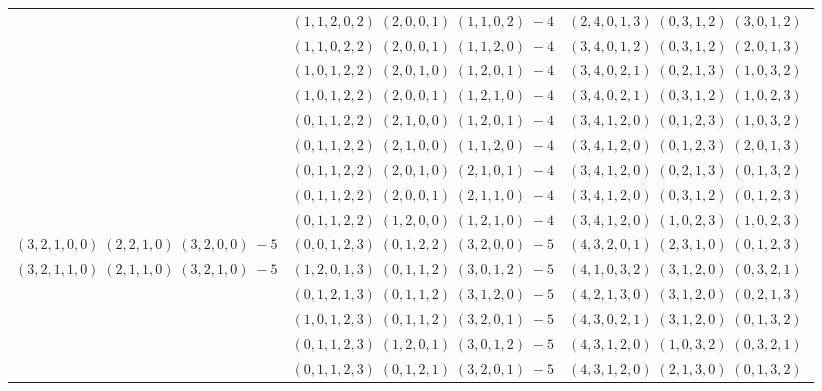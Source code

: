 \documentclass[11pt]{article}
\begin{document}
\begin{longtable}[l]{|c|c|c|}
 \cline{2-3} 
 & $(1 ,1 ,2 ,0 ,2) \;(2 ,0 ,0 ,1) \;(1 ,1 ,0 ,2) \;-4$ & $(2 ,4 ,0 ,1 ,3) \;(0 ,3 ,1 ,2) \;(3 ,0 ,1 ,2) \;$\\ 
 \cline{2-3} 
 & $(1 ,1 ,0 ,2 ,2) \;(2 ,0 ,0 ,1) \;(1 ,1 ,2 ,0) \;-4$ & $(3 ,4 ,0 ,1 ,2) \;(0 ,3 ,1 ,2) \;(2 ,0 ,1 ,3) \;$\\ 
 \cline{2-3} 
 & $(1 ,0 ,1 ,2 ,2) \;(2 ,0 ,1 ,0) \;(1 ,2 ,0 ,1) \;-4$ & $(3 ,4 ,0 ,2 ,1) \;(0 ,2 ,1 ,3) \;(1 ,0 ,3 ,2) \;$\\ 
 \cline{2-3} 
 & $(1 ,0 ,1 ,2 ,2) \;(2 ,0 ,0 ,1) \;(1 ,2 ,1 ,0) \;-4$ & $(3 ,4 ,0 ,2 ,1) \;(0 ,3 ,1 ,2) \;(1 ,0 ,2 ,3) \;$\\ 
 \cline{2-3} 
 & $(0 ,1 ,1 ,2 ,2) \;(2 ,1 ,0 ,0) \;(1 ,2 ,0 ,1) \;-4$ & $(3 ,4 ,1 ,2 ,0) \;(0 ,1 ,2 ,3) \;(1 ,0 ,3 ,2) \;$\\ 
 \cline{2-3} 
 & $(0 ,1 ,1 ,2 ,2) \;(2 ,1 ,0 ,0) \;(1 ,1 ,2 ,0) \;-4$ & $(3 ,4 ,1 ,2 ,0) \;(0 ,1 ,2 ,3) \;(2 ,0 ,1 ,3) \;$\\ 
 \cline{2-3} 
 & $(0 ,1 ,1 ,2 ,2) \;(2 ,0 ,1 ,0) \;(2 ,1 ,0 ,1) \;-4$ & $(3 ,4 ,1 ,2 ,0) \;(0 ,2 ,1 ,3) \;(0 ,1 ,3 ,2) \;$\\ 
 \cline{2-3} 
 & $(0 ,1 ,1 ,2 ,2) \;(2 ,0 ,0 ,1) \;(2 ,1 ,1 ,0) \;-4$ & $(3 ,4 ,1 ,2 ,0) \;(0 ,3 ,1 ,2) \;(0 ,1 ,2 ,3) \;$\\ 
 \cline{2-3} 
 & $(0 ,1 ,1 ,2 ,2) \;(1 ,2 ,0 ,0) \;(1 ,2 ,1 ,0) \;-4$ & $(3 ,4 ,1 ,2 ,0) \;(1 ,0 ,2 ,3) \;(1 ,0 ,2 ,3) \;$\\ \hline\multirow[t]{1}{*}{ $(3 ,2 ,1 ,0 ,0) \;(2 ,2 ,1 ,0) \;(3 ,2 ,0 ,0) \;-5$ }  & $(0 ,0 ,1 ,2 ,3) \;(0 ,1 ,2 ,2) \;(3 ,2 ,0 ,0) \;-5$ & $(4 ,3 ,2 ,0 ,1) \;(2 ,3 ,1 ,0) \;(0 ,1 ,2 ,3) \;$\\ \hline\multirow[t]{7}{*}{ $(3 ,2 ,1 ,1 ,0) \;(2 ,1 ,1 ,0) \;(3 ,2 ,1 ,0) \;-5$ }  & $(1 ,2 ,0 ,1 ,3) \;(0 ,1 ,1 ,2) \;(3 ,0 ,1 ,2) \;-5$ & $(4 ,1 ,0 ,3 ,2) \;(3 ,1 ,2 ,0) \;(0 ,3 ,2 ,1) \;$\\ 
 \cline{2-3} 
 & $(0 ,1 ,2 ,1 ,3) \;(0 ,1 ,1 ,2) \;(3 ,1 ,2 ,0) \;-5$ & $(4 ,2 ,1 ,3 ,0) \;(3 ,1 ,2 ,0) \;(0 ,2 ,1 ,3) \;$\\ 
 \cline{2-3} 
 & $(1 ,0 ,1 ,2 ,3) \;(0 ,1 ,1 ,2) \;(3 ,2 ,0 ,1) \;-5$ & $(4 ,3 ,0 ,2 ,1) \;(3 ,1 ,2 ,0) \;(0 ,1 ,3 ,2) \;$\\ 
 \cline{2-3} 
 & $(0 ,1 ,1 ,2 ,3) \;(1 ,2 ,0 ,1) \;(3 ,0 ,1 ,2) \;-5$ & $(4 ,3 ,1 ,2 ,0) \;(1 ,0 ,3 ,2) \;(0 ,3 ,2 ,1) \;$\\ 
 \cline{2-3} 
 & $(0 ,1 ,1 ,2 ,3) \;(0 ,1 ,2 ,1) \;(3 ,2 ,0 ,1) \;-5$ & $(4 ,3 ,1 ,2 ,0) \;(2 ,1 ,3 ,0) \;(0 ,1 ,3 ,2) \;$\\ 

\end{longtable}
\end{document}
